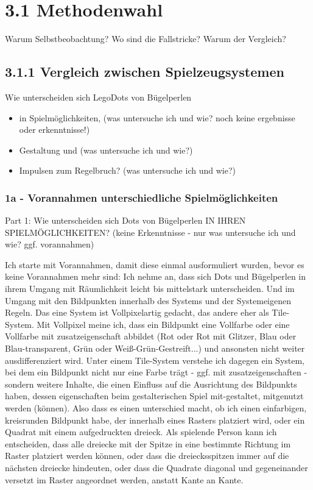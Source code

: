 \documentclass[11pt,a4paper,twoside]{scrreprt}
\begin{document}
	\section{3.1 Methodenwahl}
	Warum Selbstbeobachtung? Wo sind die Fallstricke? Warum der Vergleich? 
		\subsection{3.1.1 Vergleich zwischen Spielzeugsystemen}
			Wie unterscheiden sich LegoDots von Bügelperlen 
			\begin{itemize}
				\item in Spielmöglichkeiten, (was untersuche ich und wie? noch keine ergebnisse oder erkenntnisse!)
				\item Gestaltung und (was untersuche ich und wie?)
				\item Impulsen zum Regelbruch? (was untersuche ich und wie?)
			\end{itemize}

				\subsubsection{1a - Vorannahmen unterschiedliche Spielmöglichkeiten}
Part 1: Wie unterscheiden sich Dots von Bügelperlen IN IHREN SPIELMÖGLICHKEITEN? (keine Erkenntnisse - nur was untersuche ich und wie? ggf. vorannahmen)

Ich starte mit Vorannahmen, damit diese einmal ausformuliert wurden, bevor es keine Vorannahmen mehr sind: Ich nehme an, dass sich Dots und Bügelperlen in ihrem Umgang mit Räumlichkeit leicht bis mittelstark unterscheiden. Und im Umgang mit den Bildpunkten innerhalb des Systems und der Systemeigenen Regeln. Das eine System ist Vollpixelartig gedacht, das andere eher als Tile-System. Mit Vollpixel meine ich, dass ein Bildpunkt eine Vollfarbe oder eine Vollfarbe mit zusatzeigenschaft abbildet (Rot oder Rot mit Glitzer, Blau oder Blau-transparent, Grün oder Weiß-Grün-Gestreift...) und ansonsten nicht weiter ausdifferenziert wird. Unter einem Tile-System verstehe ich dagegen ein System, bei dem ein Bildpunkt nicht nur eine Farbe trägt - ggf. mit zusatzeigenschaften - sondern weitere Inhalte, die einen Einfluss auf die Ausrichtung des Bildpunkts haben, dessen eigenschaften beim gestalterischen Spiel mit-gestaltet, mitgenutzt werden (können). Also dass es einen unterschied macht, ob ich einen einfarbigen, kreisrunden Bildpunkt habe, der innerhalb eines Rasters platziert wird, oder ein Quadrat mit einem aufgedruckten dreieck. Als spielende Person kann ich entscheiden, dass alle dreiecke mit der Spitze in eine bestimmte Richtung im Raster platziert werden können, oder dass die dreiecksspitzen immer auf die nächsten dreiecke hindeuten, oder dass die Quadrate diagonal und gegeneinander versetzt im Raster angeordnet werden, anstatt Kante an Kante.
\end{document}
